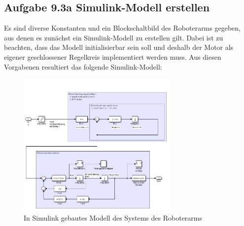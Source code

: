 \documentclass[10pt]{scrartcl}
\begin{document}
\subsection{Aufgabe 9.3a Simulink-Modell erstellen}
Es sind diverse Konstanten und ein Blockschaltbild des Roboterarms gegeben, aus denen es zunächst ein Simulink-Modell zu erstellen gilt. Dabei ist zu beachten, dass das Modell initialisierbar sein soll und deshalb der Motor als eigener geschlossener Regelkreis implementiert werden muss. Aus diesen Vorgabenen resultiert das folgende Simulink-Modell:
\begin{figure}[H]
	\centering
	\includegraphics[width=0.7\textwidth]{Theoretischer Teil/SimulinkModell.jpeg}
	\caption{In Simulink gebautes Modell des Systems des Roboterarms}
	\label{img:grafik-dummy}
\end{figure}

\end{document}
